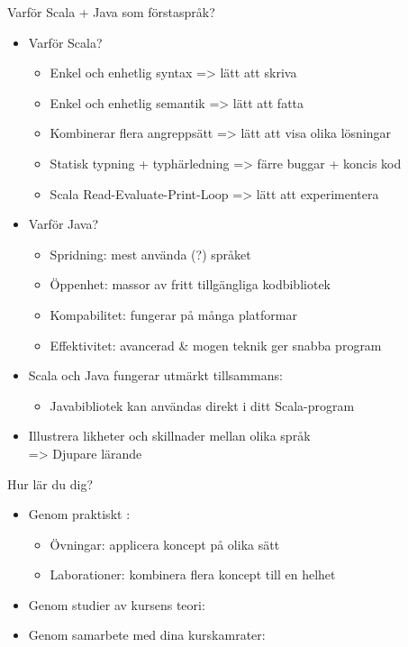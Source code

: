 \begin{SlideExtra}{Varför Scala + Java som förstaspråk?}
\begin{itemize}
\item Varför Scala?
\begin{itemize}
\item Enkel och enhetlig syntax => lätt att skriva
\item Enkel och enhetlig semantik => lätt att fatta
\item Kombinerar flera angreppsätt => lätt att visa olika lösningar
\item Statisk typning + typhärledning =>  färre buggar + koncis kod
\item Scala Read-Evaluate-Print-Loop => lätt att experimentera
\end{itemize}

\pause
\item Varför Java?
\begin{itemize}
\item Spridning: mest använda (?) språket
\item Öppenhet: massor av fritt tillgängliga kodbibliotek
\item Kompabilitet: fungerar på många platformar
\item Effektivitet: avancerad \& mogen teknik ger snabba program
\end{itemize}
\item Scala och Java fungerar utmärkt tillsammans:
\begin{itemize}
\item Javabibliotek kan användas direkt i ditt Scala-program
\end{itemize}

\item Illustrera likheter och skillnader mellan olika språk \\ => Djupare lärande
\end{itemize}
\end{SlideExtra}
\fi


\begin{Slide}{Hur lär du dig?}
\begin{itemize}
\item Genom praktiskt : 
\begin{itemize}
\item Övningar: applicera koncept på olika sätt
\item Laborationer: kombinera flera koncept till en helhet
\end{itemize}
\item Genom studier av kursens teori: 
\item Genom samarbete med dina kurskamrater: 
\end{itemize}
\end{Slide}

